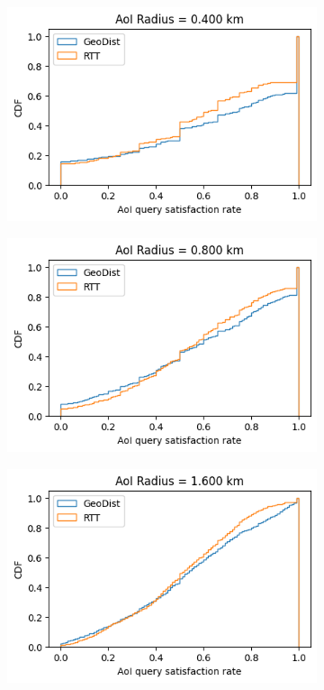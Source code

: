 \begin{figure}
\begin{subfigure}{0.3\textwidth}
  \includegraphics[width=\linewidth]{figures/mechanisms/spatial_ctx_mgmt/aoi_satisfaction_rate_cdf_AOI_0.400_km.png}
  \caption{}
\end{subfigure}
\begin{subfigure}{0.333\textwidth}
  \centering
  \includegraphics[width=\linewidth]{figures/mechanisms/spatial_ctx_mgmt/aoi_satisfaction_rate_cdf_AOI_0.800_km.png}
  \caption{}
\end{subfigure}%
\begin{subfigure}{0.333\textwidth}
  \centering
  \includegraphics[width=\linewidth]{figures/mechanisms/spatial_ctx_mgmt/aoi_satisfaction_rate_cdf_AOI_1.600_km.png}

\end{subfigure}
\end{figure}
